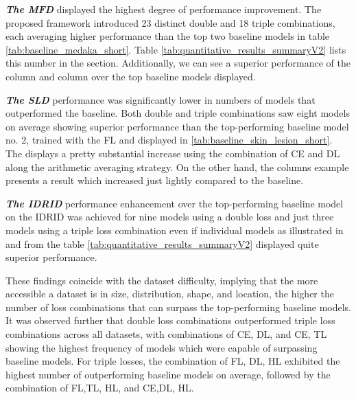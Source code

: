 \textbf{\emph{The \acf{MFD}}} displayed the highest degree of performance improvement. The proposed framework introduced 23 distinct double and 18 triple combinations, each averaging higher performance than the top two baseline models in table \ref{tab:baseline_medaka_short}. Table \ref{tab:quantitative_results_summaryV2} lists this number in the  section. Additionally, we can see a superior performance of the  column and  column over the top baseline models displayed.

\textbf{\emph{The \acf{SLD}}} performance was significantly lower in numbers of models that outperformed the baseline. Both double and triple combinations saw eight models on average showing superior performance than the top-performing baseline model no. 2, trained with the \ac{FL} and displayed in \ref{tab:baseline_skin_lesion_short}. The  displays a pretty substantial increase using the combination of \ac{CE} and \ac{DL} along the arithmetic averaging strategy. On the other hand, the  columns example presents a result which increased just lightly compared to the baseline.

\textbf{\emph{The \acf{IDRID}}} performance enhancement over the top-performing baseline model on the \ac{IDRID} was achieved for nine models using a double loss and just three models using a triple loss combination even if individual models as illustrated in  and  from the table \ref{tab:quantitative_results_summaryV2} displayed quite superior performance.

These findings coincide with the dataset difficulty, implying that the more accessible a dataset is in size, distribution, shape, and location, the higher the number of loss combinations that can surpass the top-performing baseline models. It was observed further that double loss combinations outperformed triple loss combinations across all datasets, with combinations of \ac{CE}, \ac{DL}, and \ac{CE}, \ac{TL} showing the highest frequency of models which were capable of surpassing baseline models. For triple losses, the combination of \ac{FL}, \ac{DL}, \ac{HL} exhibited the highest number of outperforming baseline models on average, followed by the combination of \ac{FL},\ac{TL}, \ac{HL}, and \ac{CE},\ac{DL}, \ac{HL}.

